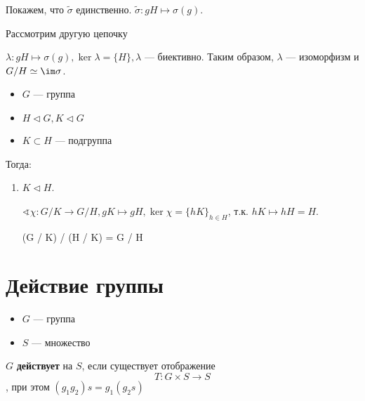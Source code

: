Покажем, что \(\tilde{\sigma}\) единственно. \(\tilde{\sigma} : gH \mapsto \sigma(g)\).

Рассмотрим другую цепочку 

\(\lambda : gH \mapsto \sigma(g), \ker \lambda = \{H\}, \lambda\) --- биективно. Таким образом, \(\lambda\) --- изоморфизм и \(G / H \simeq \im \sigma\).

\begin{remark}\itemfix
    \begin{itemize}
        \item \(G\) --- группа
        \item \(H \triangleleft G, K \triangleleft G\)
        \item \(K \subset H\) --- подгруппа
    \end{itemize}

    Тогда:
    \begin{enumerate}
        \item \(K \triangleleft H\).

              \(\sphericalangle \chi : G / K \to G / H, gK \mapsto gH, \ker \chi = \{hK\}_{h \in H}\), т.к. \(hK \mapsto hH = H\).

              \begin{myemph}
                  (G / K) / (H / K) = G / H
              \end{myemph}
    \end{enumerate}
\end{remark}

\section{Действие группы}

\begin{definition}\itemfix
    \begin{itemize}
        \item \(G\) --- группа
        \item \(S\) --- множество
    \end{itemize}

    \(G\) \textbf{действует} на \(S\), если существует отображение
    \[T : G \times S \to S\]
    , при этом \((g_1g_2)s = g_1(g_2s)\)
\end{definition}

